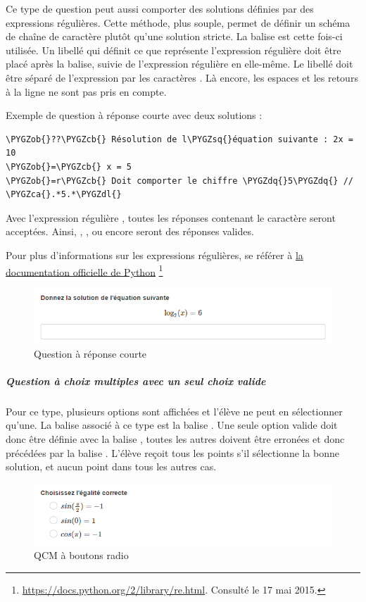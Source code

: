 \documentclass[a4,10pt,french]{sphinxmanual}
\def\PYGZob{\char`\{}
\def\PYGZcb{\char`\}}
\def\PYGZca{\char`\^}
\def\PYGZdl{\char`\$}
\def\PYGZsq{\char`\'}
\def\PYGZdq{\char`\"}
\renewcommand\PYGZsq{\textquotesingle}
\begin{document}
Ce type de question peut aussi comporter des solutions définies par des expressions régulières. Cette méthode, plus souple,
permet de définir un schéma de chaîne de caractère plutôt qu'une solution stricte. La balise
 est cette fois-ci utilisée. Un libellé qui définit ce que représente l'expression régulière doit être
placé après la balise, suivie de l'expression régulière en elle-même. Le libellé doit être séparé de l'expression
par les caractères \code{//}. Là encore, les espaces et les retours à la ligne ne sont pas pris en compte.

Exemple de question à réponse courte avec deux solutions :

\begin{Verbatim}[commandchars=\\\{\}]
\PYGZob{}??\PYGZcb{} Résolution de l\PYGZsq{}équation suivante : 2x = 10
\PYGZob{}=\PYGZcb{} x = 5
\PYGZob{}=r\PYGZcb{} Doit comporter le chiffre \PYGZdq{}5\PYGZdq{} // \PYGZca{}.*5.*\PYGZdl{}
\end{Verbatim}

Avec l'expression régulière , toutes les réponses contenant le caractère 
seront acceptées. Ainsi, , ,  ou encore  seront des réponses valides.

Pour plus d'informations sur les expressions régulières, se référer à \href{https://docs.python.org/2/library/re.html}{la documentation officielle de Python} \footnote{
\href{https://docs.python.org/2/library/re.html}{https://docs.python.org/2/library/re.html}. Consulté le 17 mai 2015.
}
\begin{figure}[htbp]
\centering
\capstart

\includegraphics[width=0.800\linewidth]{short.png}
\caption{Question à réponse courte}\end{figure}


\subparagraph{Question à choix multiples avec un seul choix valide}
\label{doc-user:question-a-choix-multiples-avec-un-seul-choix-valide}
Pour ce type, plusieurs options sont affichées et l'élève ne peut en sélectionner qu'une. La balise associé à ce type est la balise \code{\{**\}}. Une seule option valide doit donc être définie avec la balise \code{\{=\}}, toutes les autres doivent être erronées et donc précédées par la balise \code{\{*\}}. L'élève reçoit tous les points s'il sélectionne la bonne solution, et aucun point dans tous les autres cas.
\begin{figure}[htbp]
\centering
\capstart

\includegraphics[width=0.800\linewidth]{radio.png}
\caption{QCM à boutons radio}\end{figure}
\end{document}
